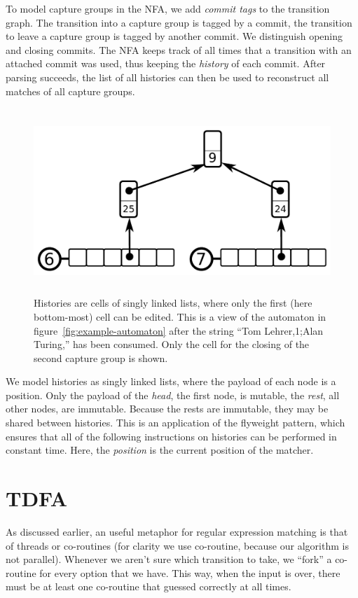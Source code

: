 \documentclass[11pt,a4paper,twoside,openright]{Thesis}
\theoremstyle{definition}
\newcommand{\Figref}[1]{figure~\ref{fig:#1}}
\newcommand{\seclabel}[1]{\label{sec:#1}}
\begin{document}
To model capture groups in the NFA, we add \emph{commit tags} to
the transition graph. The transition into a capture group is tagged
by a commit, the transition to leave a capture group is tagged by
another commit. We distinguish opening and closing commits. The
NFA keeps track of all times that a transition with an attached
commit was used, thus keeping the \emph{history} of each commit.
After parsing succeeds, the list of all histories can then be used
to reconstruct all matches of all capture groups.

\begin{figure}[htpb]
  \centering
  \includegraphics[height=7cm]{graphs/cells}
  \caption{Histories are cells of singly linked lists, where only the first 
    (here bottom-most) cell can be edited. This is a view of the automaton in 
    \Figref{example-automaton} after the string ``Tom Lehrer,1;Alan 
  Turing,'' has been consumed. Only the cell for the closing of the second 
capture group is shown.}
  \label{fig:cells}
\end{figure}

We model histories as singly linked lists, where the payload of each node is a
position.  Only the payload of the \emph{head}, the first node, is mutable, the
\emph{rest}, all other nodes, are immutable.  Because the rests are immutable,
they may be shared between histories.  This is an application of the flyweight
pattern, which ensures that all of the following instructions on histories can
be performed in constant time. Here, the \emph{position} is the current
position of the matcher.

\section{TDFA}	\seclabel{dfa}

As discussed earlier, an useful metaphor for regular expression matching is that of
threads\cite{Cox07a} or co-routines (for clarity we use
co-routine, because our algorithm is not parallel).
Whenever we aren't sure which transition to take,
we ``fork'' a co-routine for every option that we have. This way, when
the input is over, there must be at least one co-routine that guessed
correctly at all times.
\end{document}
